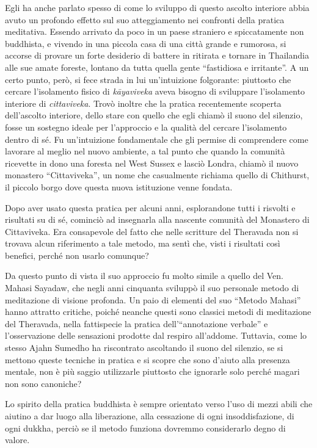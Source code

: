 Egli ha anche parlato spesso di come lo sviluppo di questo ascolto
interiore abbia avuto un profondo effetto sul suo atteggiamento nei
confronti della pratica meditativa. Essendo arrivato da poco in un paese
straniero e spiccatamente non buddhista, e vivendo in una piccola casa
di una città grande e rumorosa, si accorse di provare un forte desiderio
di battere in ritirata e tornare in Thailandia alle sue amate foreste,
lontano da tutta quella gente ``fastidiosa e irritante''. A un certo
punto, però, si fece strada in lui un'intuizione folgorante: piuttosto
che cercare l'isolamento fisico di \emph{kāyaviveka} aveva bisogno di
sviluppare l'isolamento interiore di \emph{cittaviveka}. Trovò inoltre
che la pratica recentemente scoperta dell'ascolto interiore, dello stare
con quello che egli chiamò il suono del silenzio, fosse un sostegno
ideale per l'approccio e la qualità del cercare l'isolamento dentro di
sé. Fu un'intuizione fondamentale che gli permise di comprendere come
lavorare al meglio nel nuovo ambiente, a tal punto che quando la
comunità ricevette in dono una foresta nel West Sussex e lasciò Londra,
chiamò il nuovo monastero ``Cittaviveka'', un nome che casualmente
richiama quello di Chithurst, il piccolo borgo dove questa nuova
istituzione venne fondata.

Dopo aver usato questa pratica per alcuni anni, esplorandone tutti i
risvolti e risultati su di sé, cominciò ad insegnarla alla nascente
comunità del Monastero di Cittaviveka. Era consapevole del fatto che
nelle scritture del Theravada non si trovava alcun riferimento a tale
metodo, ma sentì che, visti i risultati così benefici, perché non usarlo
comunque?

Da questo punto di vista il suo approccio fu molto simile a quello del
Ven. Mahasi Sayadaw, che negli anni cinquanta sviluppò il suo personale
metodo di meditazione di visione profonda. Un paio di elementi del suo
``Metodo Mahasi'' hanno attratto critiche, poiché neanche questi sono
classici metodi di meditazione del Theravada, nella fattispecie la
pratica dell'``annotazione verbale'' e l'osservazione delle sensazioni
prodotte dal respiro all'addome. Tuttavia, come lo stesso Ajahn Sumedho
ha riscontrato ascoltando il suono del silenzio, se si mettono queste
tecniche in pratica e si scopre che sono d'aiuto alla presenza mentale,
non è più saggio utilizzarle piuttosto che ignorarle solo perché magari
non sono canoniche?

Lo spirito della pratica buddhista è sempre orientato verso l'uso di
mezzi abili che aiutino a dar luogo alla liberazione, alla cessazione di
ogni insoddisfazione, di ogni dukkha, perciò se il metodo funziona
dovremmo considerarlo degno di valore.

